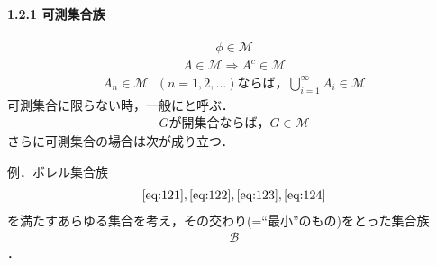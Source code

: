 \documentclass[letterpaper,10pt,english]{sphinxmanual}
\begin{document}
\paragraph{1.2.1 可測集合族}
\label{\detokenize{src/stochasticcalculus/2020-03-16-lebesgue:id6}}\begin{equation*}
\begin{split}\begin{equation}
\phi \in \mathcal{M}
\label{eq:121}\tag{M1}
\end{equation}\end{split}
\end{equation*}\begin{equation*}
\begin{split}\begin{equation}
A \in \mathcal{M} \Longrightarrow A^{c} \in \mathcal{M}
\label{eq:122}\tag{M2}
\end{equation}\end{split}
\end{equation*}\begin{equation*}
\begin{split}\begin{equation}
A_{n} \in \mathcal{M} \text{  } (n=1,2,...) \text{ならば，} \bigcup_{i=1}^{\infty} A_{i} \in \mathcal{M}
\label{eq:123}\tag{M3}
\end{equation}\end{split}
\end{equation*}
\sphinxAtStartPar
可測集合に限らない時，一般にと呼ぶ．
\begin{equation*}
\begin{split}\begin{equation}
G\text{が開集合ならば，} G \in \mathcal{M}
\label{eq:124}\tag{M4}
\end{equation}\end{split}
\end{equation*}
\sphinxAtStartPar
さらに可測集合の場合は次が成り立つ．

\sphinxAtStartPar
例．ボレル集合族
\begin{equation*}
\begin{split}\eqref{eq:121}, \eqref{eq:122},\eqref{eq:123},\eqref{eq:124}\end{split}
\end{equation*}
\sphinxAtStartPar
を満たすあらゆる集合を考え，その交わり(=“最小”のもの)をとった集合族
\begin{equation*}
\begin{split}\mathcal{B}\end{split}
\end{equation*}
\sphinxAtStartPar
．
\end{document}
